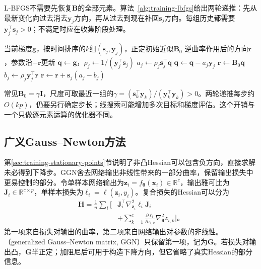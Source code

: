L-BFGS不需要先恢复$\bm B$的全部元素。算法~\ref{alg:training-lbfgs}给出两轮递推：先从最新变化向过去消去$\bm y_j$方向，再从过去到现在补回$\bm s_j$方向。每组历史都需要$\bm y_j^{\top}\bm s_j>0$；不满足时应在收集阶段处理。
\begin{algorithm}[L-BFGS两轮递推]
  \label{alg:training-lbfgs}
  \begin{algorithmic}[1]
    \Require 当前梯度$\bm g$，按时间排序的$k$组$(\bm s_j,\bm y_j)$，正定初始近似$\bm B_0$
    \Ensure 逆曲率作用后的方向$\bm r$，参数沿$-\bm r$更新
    \State $\bm q\gets\bm g$，$\rho_j\gets1/(\bm y_j^{\top}\bm s_j)$
      \State $a_j\gets\rho_j\bm s_j^{\top}\bm q$
      \State $\bm q\gets\bm q-a_j\bm y_j$
    \EndFor
    \State $\bm r\gets\bm B_0\bm q$
      \State $b_j\gets\rho_j\bm y_j^{\top}\bm r$
      \State $\bm r\gets\bm r+\bm s_j(a_j-b_j)$
    \EndFor
  \end{algorithmic}
\end{algorithm}
常见$\bm B_0=\gamma\bm I$，尺度可取最近一组的$\gamma=(\bm s_k^{\top}\bm y_k)/(\bm y_k^{\top}\bm y_k)>0$。两轮递推每步约$O(kp)$，仍要另行确定步长；线搜索可能增加多次目标和梯度评估。这个开销与一个只做逐元素运算的优化器不同。

\subsection{广义Gauss--Newton方法}
\label{sec:training-generalized-curvature}

第\ref{sec:training-stationary-points}节说明了非凸Hessian可以包含负方向，直接求解未必得到下降步。GGN舍去网络输出非线性带来的一部分曲率，保留输出损失中更易控制的部分。令单样本网络输出为$\bm z_i=f_{\bm\theta}(\bm x_i)\in\mathbb R^c$，输出雅可比为$\bm J_i\in\mathbb R^{c\times p}$，单样本损失为$\ell_i=\ell(\bm z_i,y_i)$。复合损失的Hessian可以分为
\begin{equation}
  \begin{aligned}
  \bm H=\frac1n\sum_i\bigg[
    &\bm J_i^{\top}\nabla_{\bm z_i}^2\ell_i\bm J_i\\
    &+\sum_{k=1}^c\frac{\partial\ell_i}{\partial z_{i,k}}
         \nabla_{\bm\theta}^2z_{i,k}\bigg]\text{。}
  \end{aligned}
  \label{eq:training-hessian-decomposition}
\end{equation}
第一项来自损失对输出的曲率，第二项来自网络输出对参数的非线性。（generalized Gauss--Newton matrix, GGN）只保留第一项，记为$\bm G$。若损失对输出凸，$\bm G$半正定；加阻尼后可用于构造下降方向，但它省略了真实Hessian的部分信息。

